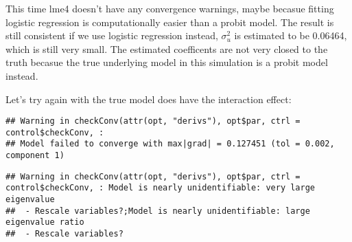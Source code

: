 \documentclass[]{article}
\newenvironment{Shaded}{\begin{snugshade}}{\end{snugshade}}
\newcommand{\DataTypeTok}[1]{\textcolor[rgb]{0.13,0.29,0.53}{#1}}
\newcommand{\DecValTok}[1]{\textcolor[rgb]{0.00,0.00,0.81}{#1}}
\newcommand{\KeywordTok}[1]{\textcolor[rgb]{0.13,0.29,0.53}{\textbf{#1}}}
\newcommand{\NormalTok}[1]{#1}
\newcommand{\OperatorTok}[1]{\textcolor[rgb]{0.81,0.36,0.00}{\textbf{#1}}}
\newcommand{\StringTok}[1]{\textcolor[rgb]{0.31,0.60,0.02}{#1}}
\begin{document}
This time lme4 doesn't have any convergence warnings, maybe becasue
fitting logistic regression is computationally easier than a probit
model. The result is still consistent if we use logistic regression
instead, \(\sigma_u^2\) is estimated to be 0.06464, which is still very
small. The estimated coefficents are not very closed to the truth
becasue the true underlying model in this simulation is a probit model
instead.

Let's try again with the true model does have the interaction effect:

\begin{Shaded}
\end{Shaded}

\begin{verbatim}
## Warning in checkConv(attr(opt, "derivs"), opt$par, ctrl = control$checkConv, :
## Model failed to converge with max|grad| = 0.127451 (tol = 0.002, component 1)
\end{verbatim}

\begin{verbatim}
## Warning in checkConv(attr(opt, "derivs"), opt$par, ctrl = control$checkConv, : Model is nearly unidentifiable: very large eigenvalue
##  - Rescale variables?;Model is nearly unidentifiable: large eigenvalue ratio
##  - Rescale variables?
\end{verbatim}
\end{document}
